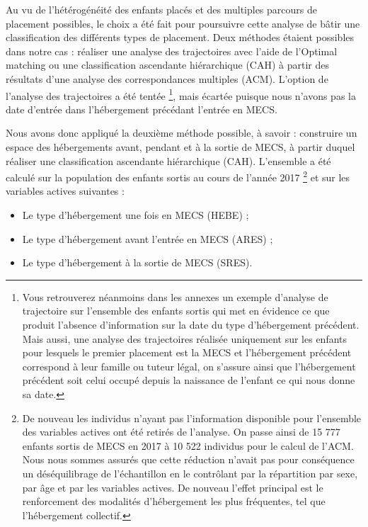 \documentclass[
  12,
  a4paper,
]{report}
\providecommand{\tightlist}{%
  \setlength{\itemsep}{0pt}\setlength{\parskip}{0pt}}
\begin{document}
Au vu de l'hétérogénéité des enfants placés et des multiples parcours de
placement possibles, le choix a été fait pour poursuivre cette analyse
de bâtir une classification des différents types de placement. Deux
méthodes étaient possibles dans notre cas : réaliser une analyse des
trajectoires avec l'aide de l'Optimal matching ou une classification
ascendante hiérarchique (CAH) à partir des résultats d'une analyse des
correspondances multiples (ACM). L'option de l'analyse des trajectoires
a été tentée
\footnote{Vous retrouverez néanmoins dans les annexes un exemple d'analyse de trajectoire sur l'ensemble des enfants sortis qui met en évidence ce que produit l'absence d'information sur la date du type
d'hébergement précédent. Mais aussi, une analyse des trajectoires réalisée uniquement sur les enfants pour lesquels le premier placement est la MECS et l'hébergement précédent correspond à leur famille ou tuteur légal, on s'assure ainsi que l'hébergement précédent soit celui occupé depuis la naissance de l'enfant ce qui nous donne sa date.},
mais écartée puisque nous n'avons pas la date d'entrée dans
l'hébergement précédant l'entrée en MECS.

Nous avons donc appliqué la deuxième méthode possible, à savoir :
construire un espace des hébergements avant, pendant et à la sortie de
MECS, à partir duquel réaliser une classification ascendante
hiérarchique (CAH). L'ensemble a été calculé sur la population des
enfants sortis au cours de l'année 2017
\footnote{De nouveau les individus n'ayant pas l'information disponible pour l'ensemble des variables actives ont été retirés de l'analyse. On passe ainsi de 15 777 enfants sortis de MECS en 2017 à 10 522 individus pour le calcul de l'ACM. Nous nous sommes assurés que cette réduction n'avait pas pour conséquence un déséquilibrage de l'échantillon en le contrôlant par la répartition par sexe, par âge et par les variables actives. De nouveau l'effet principal est le renforcement des modalités d'hébergement les plus fréquentes, tel que l'hébergement collectif.}
et sur les variables actives suivantes :

\begin{itemize}
\tightlist
\item
  Le type d'hébergement une fois en MECS (HEBE) ;
\item
  Le type d'hébergement avant l'entrée en MECS (ARES) ;
\item
  Le type d'hébergement à la sortie de MECS (SRES).
\end{itemize}
\end{document}
